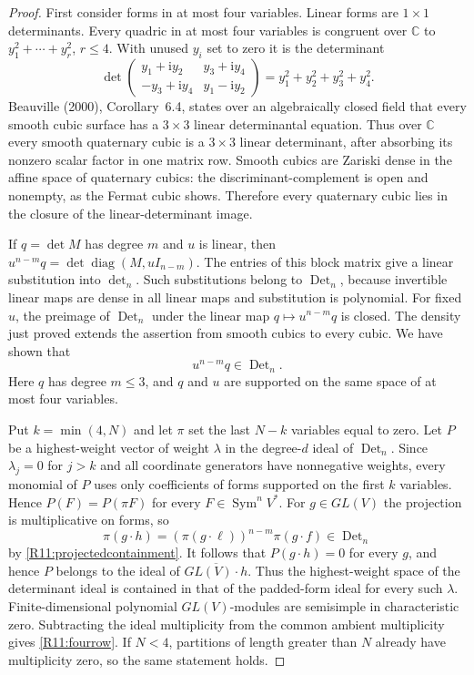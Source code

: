 \documentclass[11pt,a4paper]{article}
\theoremstyle{definition}\newtheorem{definition}{Definition}
\begin{document}
\begin{proof}
First consider forms in at most four variables. Linear forms are
$1\times1$ determinants. Every quadric in at most four variables
is congruent over $\mathbb C$ to $y_1^2+\cdots+y_r^2$, $r\leq4$.
With unused $y_i$ set to zero it is the determinant
\begin{equation}\label{R11:quadric}
 \det\begin{pmatrix}
 y_1+\mathrm i y_2&y_3+\mathrm i y_4\\
 -y_3+\mathrm i y_4&y_1-\mathrm i y_2
 \end{pmatrix}=
 y_1^2+y_2^2+y_3^2+y_4^2.
\end{equation}
Beauville (2000), Corollary~6.4, states over an algebraically
closed field that every smooth cubic surface has a $3\times3$
linear determinantal equation. Thus over $\mathbb C$ every smooth
quaternary cubic is a $3\times3$ linear determinant, after
absorbing its nonzero scalar factor in one matrix row.
Smooth cubics are Zariski dense in the affine space of quaternary
cubics: the discriminant-complement is open and nonempty, as the
Fermat cubic shows. Therefore every quaternary cubic lies in the
closure of the linear-determinant image.

If $q=\det M$ has degree $m$ and $u$ is linear, then
$u^{n-m}q=\det\operatorname{diag}(M,uI_{n-m})$.
The entries of this block matrix give a linear substitution into
$\det_n$. Such substitutions belong to $\operatorname{Det}_n$,
because invertible linear maps are dense in all linear maps and
substitution is polynomial. For fixed $u$, the preimage of
$\operatorname{Det}_n$ under the linear map $q\mapsto u^{n-m}q$
is closed. The density just proved extends the assertion from
smooth cubics to every cubic. We have shown that
\begin{equation}\label{R11:projectedcontainment}
 u^{n-m}q\in\operatorname{Det}_n.
\end{equation}
Here $q$ has degree $m\leq3$, and $q$ and $u$ are supported
on the same space of at most four variables.

Put $k=\min(4,N)$ and let $\pi$ set the last $N-k$ variables
equal to zero. Let $P$ be a highest-weight vector of weight
$\lambda$ in the degree-$d$ ideal of $\operatorname{Det}_n$.
Since $\lambda_j=0$ for $j>k$ and all coordinate generators have
nonnegative weights, every monomial of $P$ uses only coefficients
of forms supported on the first $k$ variables. Hence
$P(F)=P(\pi F)$ for every $F\in\operatorname{Sym}^nV^*$.
For $g\in GL(V)$ the projection is multiplicative on forms, so
\[
 \pi(g\cdot h)=(\pi(g\cdot\ell))^{n-m}\pi(g\cdot f)
 \in\operatorname{Det}_n
\]
by \eqref{R11:projectedcontainment}. It follows that
$P(g\cdot h)=0$ for every $g$, and hence $P$ belongs to the
ideal of $\overline{GL(V)\cdot h}$.
Thus the highest-weight space of the determinant ideal is
contained in that of the padded-form ideal for every such
$\lambda$. Finite-dimensional polynomial $GL(V)$-modules are
semisimple in characteristic zero. Subtracting the ideal
multiplicity from the common ambient multiplicity gives
\eqref{R11:fourrow}. If $N<4$, partitions of length greater than
$N$ already have multiplicity zero, so the same statement holds.
\end{proof}
\end{document}
